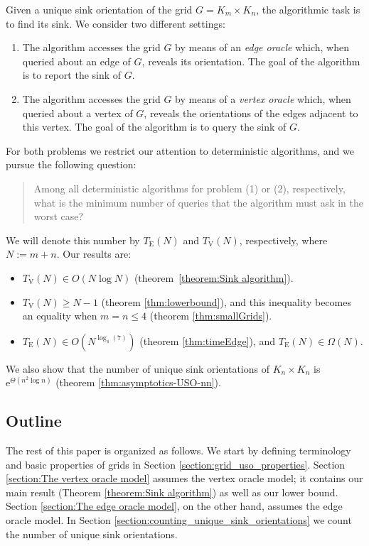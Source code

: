 \documentclass[runningheads,a4paper]{llncs}
\newcommand{\timeEdge}{\ensuremath{T_\mathrm{E}}}
\newcommand{\timeVertex}{\ensuremath{T_\mathrm{V}}}
\newcommand{\e}{\ensuremath{\mathrm{e}}}
\begin{document}
Given a unique sink orientation of the grid $G = K_m \times K_n$, the
algorithmic task is to find its sink.
We consider two different settings:
\begin{enumerate}[\quad (1)]
    \item
        The algorithm accesses the grid $G$ by means of an \emph{edge oracle}
        which, when queried about an edge of $G$, reveals its orientation.
        The goal of the algorithm is to report the sink of $G$.

    \item
        The algorithm accesses the grid $G$ by means of a \emph{vertex oracle}
        which, when queried about a vertex of $G$, reveals the orientations of
        the edges adjacent to this vertex.
        The goal of the algorithm is to query the sink of $G$.

\end{enumerate}
For both problems we restrict our attention to deterministic algorithms, and
we pursue the following question:
\begin{quote}
    Among all deterministic algorithms for problem (1) or (2), respectively,
    what is the minimum number of queries that the algorithm must ask in the
    worst case?
\end{quote}
We will denote this number by $\timeEdge(N)$ and
$\timeVertex(N)$, respectively, where $N := m + n$.
Our results are:

\begin{itemize}
    \item
        $\timeVertex(N) \in O(N \log N)$ (theorem~\ref{theorem:Sink algorithm}).
    \item
        $\timeVertex(N) \ge N-1$ (theorem \ref{thm:lowerbound}), and this
        inequality becomes an equality when $m = n \le 4$
        (theorem \ref{thm:smallGrids}).
    \item
        $\timeEdge(N) \in O(N ^ { \log_4(7) })$ (theorem \ref{thm:timeEdge}),
        and $\timeEdge(N) \in \Omega(N)$.
\end{itemize}
We also show that the number of unique sink orientations of $K_n \times K_n$
is $\e^{ \Theta(n^2 \log n) }$ (theorem \ref{thm:asymptotics-USO-nn}).

\subsection{Outline}

The rest of this paper is organized as follows.
We start by defining terminology and basic properties of grids in Section \ref{section:grid_uso_properties}.
Section \ref{section:The vertex oracle model} assumes the vertex oracle model;
it contains our main result (Theorem \ref{theorem:Sink algorithm})
as well as our lower bound.
Section \ref{section:The edge oracle model}, on the other hand, assumes the
edge oracle model.
In Section \ref{section:counting_unique_sink_orientations} we count the number of unique sink orientations.
\end{document}
